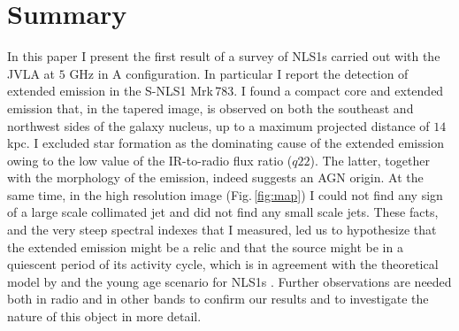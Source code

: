 \documentclass[../thesis.tex]{subfiles}
\begin{document}
\section{Summary}
\label{sec:summary}

In this paper I present the first result of a survey of NLS1s carried out with the JVLA at $5$ GHz in A configuration.
In particular I report the detection of extended emission in the S-NLS1 Mrk\,783.
I found a compact core and extended emission that, in the tapered image, is observed on both the southeast and northwest sides of the galaxy nucleus, up to a maximum projected distance of $14$ kpc.
I excluded star formation as the dominating cause of the extended emission owing to the low value of the IR-to-radio flux ratio ($q22$).
The latter, together with the morphology of the emission, indeed suggests an AGN origin.
At the same time, in the high resolution image (Fig.\,\ref{fig:map}) I could not find any sign of a large scale collimated jet and \citet{Doi13} did not find any small scale jets.
These facts, and the very steep spectral indexes that I measured, led us to hypothesize that the extended emission might be a relic and that the source might be in a quiescent period of its activity cycle, which is in agreement with the theoretical model by \citet{Czerny09} and the young age scenario for NLS1s \citep{Mathur00}. 
Further observations are needed both in radio and in other bands to confirm our results and to investigate the nature of this object  in more detail. 

\biblio
\end{document}
